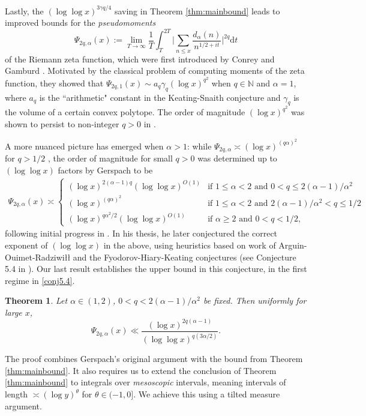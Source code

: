 \documentclass{amsart}
\newtheorem{theorem}{Theorem}[section]
\theoremstyle{definition}
\theoremstyle{remark}
\numberwithin{equation}{section}
\begin{document}
\bigskip
Lastly, the $(\log\log x)^{3\gamma q/4}$ saving in Theorem \ref{thm:mainbound} leads to improved bounds for the \textit{pseudomoments} 
\[
\Psi_{2q,\alpha}(x):= \lim_{T\to\infty} \frac{1}{T}\int_{T}^{2T} \bigg|\sum_{n\leq x}\frac{d_\alpha(n)}{n^{1/2+it}}\bigg|^{2q}\mathrm{d}t
\]
of the Riemann zeta function, which were first introduced by Conrey and Gamburd \cite{ConreyGamburd}. Motivated by the classical problem of computing {moments} of the zeta function, they showed that $\Psi_{2q,1}(x)\sim a_q \gamma_q(\log x)^{q^2}$ when $q\in \mathbb{N}$ and $\alpha=1$, where $a_q$ is the ``arithmetic" constant in the Keating-Snaith conjecture \cite{KS} and $\gamma_q$ is the volume of a certain convex polytope. The order of magnitude $(\log x)^{q^2}$ was shown to persist to non-integer $q>0$ in \cite{BondarenkoHeapSeip, GerspachLow}.

A more nuanced picture has emerged when $\alpha> 1$: while $\Psi_{2q,\alpha}\asymp (\log x)^{(q\alpha)^2}$ for $q>1/2$ \cite{BondarenkoHeapSeip}, the order of magnitude for small $q>0$ was determined up to $(\log\log x)$ factors by Gerspach \cite{GerspachLow} to be 
\begin{align}\label{conj5.4}
    \Psi_{2q,\alpha}(x)\asymp \left\{
		\begin{array}{lll}
			(\log x)^{2(\alpha-1)q}(\log\log  x)^{O(1)} & \mbox{if } 1\leq \alpha <2 \mbox{ and }0<q\leq 2(\alpha-1)/\alpha^2 \\
			(\log x)^{(q\alpha)^2} & \mbox{if }  1\leq \alpha <2\mbox{ and }  2(\alpha-1)/\alpha^2<q\leq 1/2\\
			(\log x)^{q\alpha^2/2}(\log\log x)^{O(1)} & \mbox{if }\alpha\geq 2\mbox{ and } 0<q<1/2,
		\end{array}
	\right.
\end{align}
following initial progress in \cite{BSSZ}. In his thesis, he later conjectured the correct exponent of $(\log\log x)$ in the above, using heuristics based on work of Arguin-Ouimet-Radziwiłł \cite{AOR} and the Fyodorov-Hiary-Keating conjectures (see Conjecture 5.4 in \cite{Gerspach}). Our last result establishes the upper bound in this conjecture, in the first regime in \eqref{conj5.4}.
\begin{theorem}\label{thm:pseudomoments} Let $\alpha\in (1,2)$, $0<q<2(\alpha-1)/\alpha^2$ be fixed. Then uniformly for large $x$,
\[
    \Psi_{2q,\alpha}(x)\ll \frac{(\log x)^{2q(\alpha-1)}}{(\log\log x)^{q(3\alpha/2)}}.
\]
\end{theorem}
\noindent The proof combines Gerspach's original argument \cite{Gerspach} with the bound from Theorem \ref{thm:mainbound}. It also requires us to extend the conclusion of Theorem \ref{thm:mainbound} to integrals over \textit{mesoscopic} intervals, meaning intervals of length $\asymp(\log y)^\theta$ for $\theta\in (-1,0]$. We achieve this using a tilted measure argument.
\end{document}
